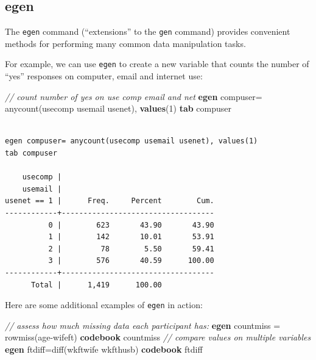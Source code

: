 \documentclass[
]{book}
\newenvironment{Shaded}{\begin{snugshade}}{\end{snugshade}}
\newcommand{\CommentTok}[1]{\textcolor[rgb]{0.56,0.35,0.01}{\textit{#1}}}
\newcommand{\FunctionTok}[1]{\textcolor[rgb]{0.00,0.00,0.00}{#1}}
\newcommand{\KeywordTok}[1]{\textcolor[rgb]{0.13,0.29,0.53}{\textbf{#1}}}
\newcommand{\NormalTok}[1]{#1}
\begin{document}
\hypertarget{egen}{%
\subsection{egen}\label{egen}}

The \texttt{egen} command (``extensions'' to the \texttt{gen} command) provides convenient methods for performing many common data manipulation tasks.

For example, we can use \texttt{egen} to create a new variable that counts the number of ``yes'' responses on computer, email and internet use:

\begin{Shaded}
\begin{Highlighting}[]
  \CommentTok{// count number of yes on use comp email and net }
  \KeywordTok{egen}\NormalTok{ compuser= }\FunctionTok{anycount}\NormalTok{(usecomp usemail usenet), }\KeywordTok{values}\NormalTok{(1)}
  \KeywordTok{tab}\NormalTok{ compuser}
\end{Highlighting}
\end{Shaded}

\begin{verbatim}

egen compuser= anycount(usecomp usemail usenet), values(1)
tab compuser

    usecomp |
    usemail |
usenet == 1 |      Freq.     Percent        Cum.
------------+-----------------------------------
          0 |        623       43.90       43.90
          1 |        142       10.01       53.91
          2 |         78        5.50       59.41
          3 |        576       40.59      100.00
------------+-----------------------------------
      Total |      1,419      100.00
\end{verbatim}

Here are some additional examples of \texttt{egen} in action:

\begin{Shaded}
\begin{Highlighting}[]
  \CommentTok{// assess how much missing data each participant has:}
  \KeywordTok{egen}\NormalTok{ countmiss = }\FunctionTok{rowmiss}\NormalTok{(age-wifeft)}
  \KeywordTok{codebook}\NormalTok{ countmiss}
  \CommentTok{// compare values on multiple variables}
  \KeywordTok{egen}\NormalTok{ ftdiff=}\FunctionTok{diff}\NormalTok{(wkftwife wkfthusb)}
  \KeywordTok{codebook}\NormalTok{ ftdiff}
\end{Highlighting}
\end{Shaded}
\end{document}
